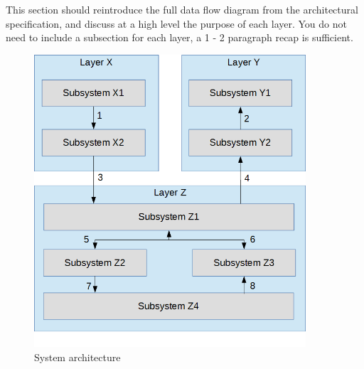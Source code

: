 This section should reintroduce the full data flow diagram from the architectural specification, and discuss at a high level the purpose of each layer. You do not need to include a subsection for each layer, a 1 - 2 paragraph recap is sufficient.

\begin{figure}[h!]
	\centering
 	\includegraphics[width=0.90\textwidth]{images/data_flow}
 \caption{System architecture}
\end{figure}
